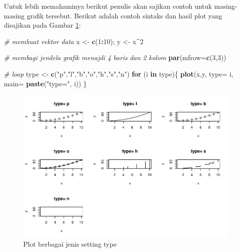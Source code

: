 \documentclass[]{book}
\newenvironment{Shaded}{\begin{snugshade}}{\end{snugshade}}
\newcommand{\KeywordTok}[1]{\textcolor[rgb]{0.13,0.29,0.53}{\textbf{#1}}}
\newcommand{\DataTypeTok}[1]{\textcolor[rgb]{0.13,0.29,0.53}{#1}}
\newcommand{\DecValTok}[1]{\textcolor[rgb]{0.00,0.00,0.81}{#1}}
\newcommand{\StringTok}[1]{\textcolor[rgb]{0.31,0.60,0.02}{#1}}
\newcommand{\CommentTok}[1]{\textcolor[rgb]{0.56,0.35,0.01}{\textit{#1}}}
\newcommand{\ControlFlowTok}[1]{\textcolor[rgb]{0.13,0.29,0.53}{\textbf{#1}}}
\newcommand{\OperatorTok}[1]{\textcolor[rgb]{0.81,0.36,0.00}{\textbf{#1}}}
\newcommand{\NormalTok}[1]{#1}
\begin{document}
Untuk lebih memahaminya berikut penulis akan sajikan contoh untuk
masing-masing grafik tersebut. Berikut adalah contoh sintaks dan hasil
plot yang disajikan pada Gambar \ref{fig:plot}:

\begin{Shaded}
\begin{Highlighting}[]
\CommentTok{# membuat vektor data }
\NormalTok{x <-}\StringTok{ }\KeywordTok{c}\NormalTok{(}\DecValTok{1}\OperatorTok{:}\DecValTok{10}\NormalTok{); y <-}\StringTok{ }\NormalTok{x}\OperatorTok{^}\DecValTok{2}
\end{Highlighting}
\end{Shaded}

\begin{Shaded}
\begin{Highlighting}[]
\CommentTok{# membagi jendela grafik menajdi 4 baris dan 2 kolom}
\KeywordTok{par}\NormalTok{(}\DataTypeTok{mfrow=}\KeywordTok{c}\NormalTok{(}\DecValTok{3}\NormalTok{,}\DecValTok{3}\NormalTok{))}

\CommentTok{# loop}
\NormalTok{type <-}\StringTok{ }\KeywordTok{c}\NormalTok{(}\StringTok{"p"}\NormalTok{,}\StringTok{"l"}\NormalTok{,}\StringTok{"b"}\NormalTok{,}\StringTok{"o"}\NormalTok{,}\StringTok{"h"}\NormalTok{,}\StringTok{"s"}\NormalTok{,}\StringTok{"n"}\NormalTok{)}
\ControlFlowTok{for}\NormalTok{ (i }\ControlFlowTok{in}\NormalTok{ type)\{}
  \KeywordTok{plot}\NormalTok{(x,y, }\DataTypeTok{type=}\NormalTok{ i,}
       \DataTypeTok{main=} \KeywordTok{paste}\NormalTok{(}\StringTok{"type="}\NormalTok{, i))}
\NormalTok{\}}
\end{Highlighting}
\end{Shaded}

\begin{figure}

{\centering \includegraphics[width=0.8\linewidth]{EnvStat_files/figure-latex/plot-1} 

}

\caption{Plot berbagai jenis setting type}\label{fig:plot}
\end{figure}
\end{document}
